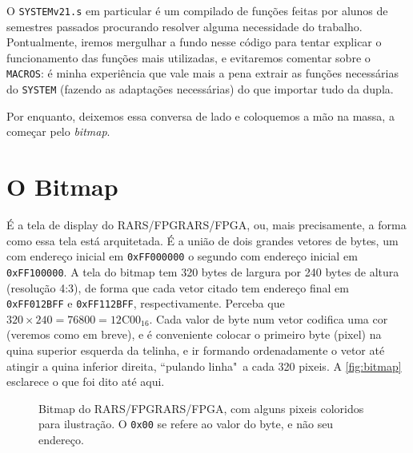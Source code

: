 \documentclass[10pt, a4paper, twoside]{article}
\begin{document}
        O {\tt SYSTEMv21.s} em particular é um compilado de funções feitas por alunos de semestres passados procurando resolver alguma necessidade do trabalho.
        Pontualmente, iremos mergulhar a fundo nesse código para tentar explicar o funcionamento das funções mais utilizadas, e evitaremos comentar sobre o {\tt MACROS}:
        é minha experiência que vale mais a pena extrair as funções necessárias do {\tt SYSTEM} (fazendo as adaptações necessárias) do que importar tudo da dupla.
        
        Por enquanto, deixemos essa conversa de lado e coloquemos a mão na massa, a começar pelo \textit{bitmap}.
  
  \section{O Bitmap}
    É a tela de display do RARS/FPGRARS/FPGA, ou, mais precisamente, a forma como essa tela está arquitetada.
    É a união de dois grandes vetores de bytes, um com endereço inicial em {\tt 0xFF000000} o segundo com endereço inicial em {\tt 0xFF100000}.
    A tela do bitmap tem 320 bytes de largura por 240 bytes de altura (resolução 4:3), de forma que cada vetor citado tem endereço final em {\tt 0xFF012BFF} e {\tt 0xFF112BFF}, respectivamente. 
    Perceba que 
    $320\times 240 = 76800 = 12\text{C}00_{16}$. 
    Cada valor de byte num vetor codifica uma cor (veremos como em breve), e é conveniente colocar o primeiro byte (pixel) na quina superior esquerda da telinha, e ir formando ordenadamente o vetor até atingir a quina inferior direita, ``pulando linha"~a cada 320 pixeis.
    A \autoref{fig:bitmap} esclarece o que foi dito até aqui.
    \begin{figure}[H]\centering
        \caption{%
            Bitmap do RARS/FPGRARS/FPGA, com alguns pixeis coloridos para ilustração. 
            O {\tt 0x00} se refere ao valor do byte, e não seu endereço.
        }
        \label{fig:bitmap}
        
    \end{figure}
    
\end{document}
